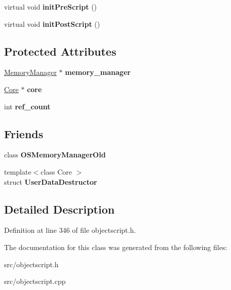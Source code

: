 \begin{DoxyCompactItemize}
\item 
virtual void {\bfseries init\+Pre\+Script} ()\hypertarget{class_object_script_1_1_o_s_adf417999f3150a7f6602a96a8a1f76ce}{}\label{class_object_script_1_1_o_s_adf417999f3150a7f6602a96a8a1f76ce}

\item 
virtual void {\bfseries init\+Post\+Script} ()\hypertarget{class_object_script_1_1_o_s_a93b74eb428316688be09be75160a6e2b}{}\label{class_object_script_1_1_o_s_a93b74eb428316688be09be75160a6e2b}

\end{DoxyCompactItemize}
\subsection*{Protected Attributes}
\begin{DoxyCompactItemize}
\item 
\hyperlink{class_object_script_1_1_o_s_1_1_memory_manager}{Memory\+Manager} $\ast$ {\bfseries memory\+\_\+manager}\hypertarget{class_object_script_1_1_o_s_a45525748f43c0aeb6a1acb48cd91ff66}{}\label{class_object_script_1_1_o_s_a45525748f43c0aeb6a1acb48cd91ff66}

\item 
\hyperlink{class_object_script_1_1_o_s_1_1_core}{Core} $\ast$ {\bfseries core}\hypertarget{class_object_script_1_1_o_s_a4189e629717fb54473e1db6e87e995db}{}\label{class_object_script_1_1_o_s_a4189e629717fb54473e1db6e87e995db}

\item 
int {\bfseries ref\+\_\+count}\hypertarget{class_object_script_1_1_o_s_af3eaf9f94a2e1054358f298775da8866}{}\label{class_object_script_1_1_o_s_af3eaf9f94a2e1054358f298775da8866}

\end{DoxyCompactItemize}
\subsection*{Friends}
\begin{DoxyCompactItemize}
\item 
class {\bfseries O\+S\+Memory\+Manager\+Old}\hypertarget{class_object_script_1_1_o_s_a4d7939ded2fbcb95a031096912122ef0}{}\label{class_object_script_1_1_o_s_a4d7939ded2fbcb95a031096912122ef0}

\item 
{\footnotesize template$<$class Core $>$ }\\struct {\bfseries User\+Data\+Destructor}\hypertarget{class_object_script_1_1_o_s_adc7c69854dacb4a5be4aab5e7f94cca7}{}\label{class_object_script_1_1_o_s_adc7c69854dacb4a5be4aab5e7f94cca7}

\end{DoxyCompactItemize}


\subsection{Detailed Description}


Definition at line 346 of file objectscript.\+h.



The documentation for this class was generated from the following files\+:\begin{DoxyCompactItemize}
\item 
src/objectscript.\+h\item 
src/objectscript.\+cpp\end{DoxyCompactItemize}

